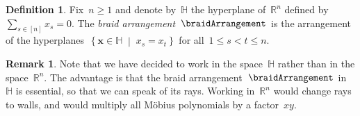 \documentclass{amsart}
\newcommand{\darkblue}{\color{darkblue}} %
\theoremstyle{definition}
\newtheorem{definition}[theorem]{Definition}
\newtheorem{remark}[theorem]{Remark}
\newcommand{\R}{\mathbb{R}} %
\renewcommand{\b}[1]{{\boldsymbol{#1}}} %
\newcommand{\set}[2]{\left\{ #1 \;\middle|\; #2 \right\}} %
\newcommand{\defn}[1]{\textsl{\darkblue #1}} %
\renewcommand{\b}[1]{\boldsymbol{#1}} %
\newcommand{\HH}{\mathbb{H}} %
\begin{document}

\begin{definition}
Fix~$n \ge 1$ and denote by~$\HH$ the hyperplane of~$\R^n$ defined by~$\sum_{s \in [n]} x_s = 0$.
The \defn{braid arrangement}~$\braidArrangement$ is the arrangement of the hyperplanes~$\set{\b{x} \in \HH}{x_s = x_t}$ for all~${1 \le s < t \le n}$.
\end{definition}

\begin{remark}
\label{rem:essential}
Note that we have decided to work in the space~$\HH$ rather than in the space~$\R^n$.
The advantage is that the braid arrangement~$\braidArrangement$ in~$\HH$ is essential, so that we can speak of its rays.
Working in~$\R^n$ would change rays to walls, and would multiply all M\"obius polynomials by a factor~$xy$.
\end{remark}
\end{document}
